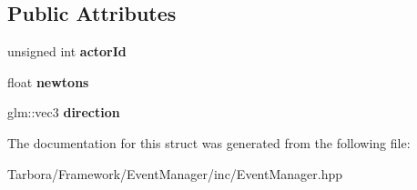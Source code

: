 \subsection*{Public Attributes}
\begin{DoxyCompactItemize}
\item 
\mbox{\label{structTarbora_1_1ApplyForceEvent_ada31fc1fc31af72e4c6417fa006f56a9}} 
unsigned int {\bfseries actor\+Id}
\item 
\mbox{\label{structTarbora_1_1ApplyForceEvent_a1136e220118da9d7254666d654a3c154}} 
float {\bfseries newtons}
\item 
\mbox{\label{structTarbora_1_1ApplyForceEvent_a975993e5ca753c4e2e50c33cebedebe8}} 
glm\+::vec3 {\bfseries direction}
\end{DoxyCompactItemize}


The documentation for this struct was generated from the following file\+:\begin{DoxyCompactItemize}
\item 
Tarbora/\+Framework/\+Event\+Manager/inc/Event\+Manager.\+hpp\end{DoxyCompactItemize}
